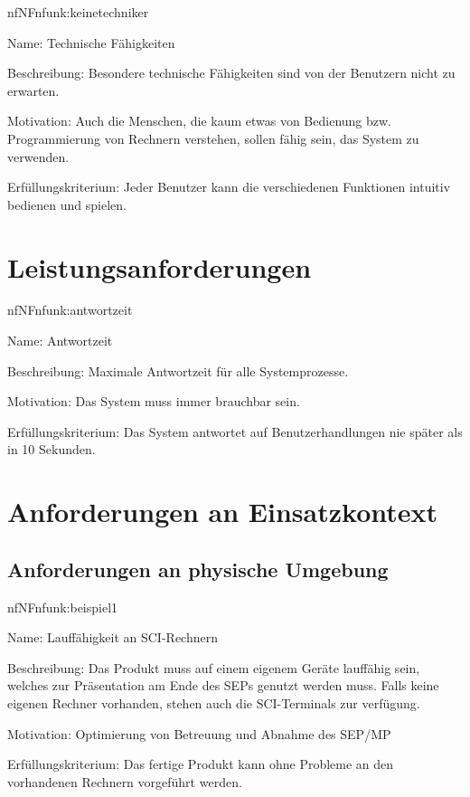 \begin{description}[leftmargin=5em, style=sameline]	
	\begin{lhp}{nf}{NF}{nfunk:keinetechniker}
		\item [Name:] Technische Fähigkeiten
		\item [Beschreibung:] Besondere technische Fähigkeiten sind von der Benutzern nicht zu erwarten.
		\item [Motivation:] Auch die Menschen, die kaum etwas von Bedienung bzw. Programmierung von Rechnern verstehen, sollen fähig sein, das System zu verwenden.
		\item [Erfüllungskriterium:]Jeder Benutzer kann die verschiedenen Funktionen intuitiv bedienen und spielen.
	\end{lhp}
\end{description}

\section{Leistungsanforderungen}

\begin{description}[leftmargin=5em, style=sameline]	
	\begin{lhp}{nf}{NF}{nfunk:antwortzeit}
		\item [Name:] Antwortzeit
		\item [Beschreibung:] Maximale Antwortzeit für alle Systemprozesse.
		\item [Motivation:] Das System muss immer brauchbar sein.
		\item [Erfüllungskriterium:] Das System antwortet auf Benutzerhandlungen nie später als in 10 Sekunden.
	\end{lhp}
\end{description}

\section{Anforderungen an Einsatzkontext}

\subsection{Anforderungen an physische Umgebung}

\begin{description}[leftmargin=5em, style=sameline]	
	\begin{lhp}{nf}{NF}{nfunk:beispiel1}
		\item [Name:] Lauffähigkeit an SCI-Rechnern
		\item [Beschreibung:] Das Produkt muss auf einem eigenem Geräte lauffähig sein, welches zur Präsentation am Ende des SEPs genutzt werden muss. Falls keine eigenen Rechner vorhanden, stehen auch die SCI-Terminals zur verfügung.
		\item [Motivation:] Optimierung von Betreuung und Abnahme des SEP/MP
		\item [Erfüllungskriterium:] Das fertige Produkt kann ohne Probleme an den vorhandenen Rechnern vorgeführt werden.
	\end{lhp}
\end{description}


